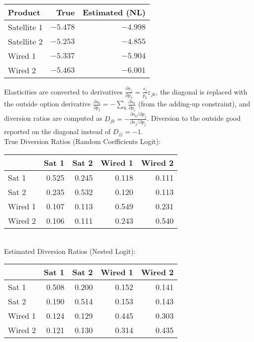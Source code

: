\documentclass[english,11pt]{article}
\begin{document}
\begin{enumerate}
\begin{center}
\begin{tabular}{lrr}
\hline
Product & True & Estimated (NL) \\
\hline
Satellite 1 & $-5.478$ & $-4.998$ \\
Satellite 2 & $-5.253$ & $-4.855$ \\
Wired 1 & $-5.337$ & $-5.904$ \\
Wired 2 & $-5.463$ & $-6.001$ \\
\hline
\end{tabular}
\end{center}

\noindent Elasticities are converted to derivatives $\frac{\partial s_j}{\partial p_k} = \frac{s_j}{p_k}\varepsilon_{jk}$, the diagonal is replaced with the outside option derivative $\frac{\partial s_0}{\partial p_j} = -\sum_k \frac{\partial s_k}{\partial p_j}$ (from the adding-up constraint), and diversion ratios are computed as $D_{jk} = -\frac{\partial s_k/\partial p_j}{\partial s_j/\partial p_j}$. Diversion to the outside good reported on the diagonal instead of $D_{jj}=-1.$ 
\\
\newline
True Diversion Ratios (Random Coefficients Logit):
\begin{center}
\begin{tabular}{lrrrr}
\hline
 & Sat 1 & Sat 2 & Wired 1 & Wired 2 \\
\hline
Sat 1 & 0.525 & 0.245 & 0.118 & 0.111 \\
Sat 2 & 0.235 & 0.532 & 0.120 & 0.113 \\
Wired 1 & 0.107 & 0.113 & 0.549 & 0.231 \\
Wired 2 & 0.106 & 0.111 & 0.243 & 0.540 \\
\hline
\end{tabular}
\end{center}
\\
\newline
Estimated Diversion Ratios (Nested Logit):
\begin{center}
\begin{tabular}{lrrrr}
\hline
 & Sat 1 & Sat 2 & Wired 1 & Wired 2 \\
\hline
Sat 1 & 0.508 & 0.200 & 0.152 & 0.141 \\
Sat 2 & 0.190 & 0.514 & 0.153 & 0.143 \\
Wired 1 & 0.124 & 0.129 & 0.445 & 0.303 \\
Wired 2 & 0.121 & 0.130 & 0.314 & 0.435 \\
\hline
\end{tabular}
\end{center}


\end{enumerate}
\end{document}
